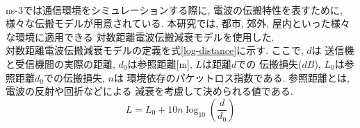 \\[1em]
\indent ns-3では通信環境をシミュレーションする際に, 
電波の伝搬特性を表すために, 様々な伝搬モデルが用意されている. 
本研究では, 都市, 郊外, 屋内といった様々な環境に適用できる
対数距離電波伝搬減衰モデルを使用した.\\ 
\indent 対数距離電波伝搬減衰モデルの定義を式\ref{log-distance}に示す. ここで, $d$は
送信機と受信機間の実際の距離, $d_0$は参照距離[m], $L$は距離$d$での
伝搬損失($dB$), $L_0$は参照距離$d_0$での伝搬損失, $n$は
環境依存のパケットロス指数である. 参照距離とは, 電波の反射や回折などによる
減衰を考慮して決められる値である. \\
\begin{equation}\label{log-distance}
  L = L_0 + 10n\log_{10}\left(\frac{d}{d_0}\right)
\end{equation}
